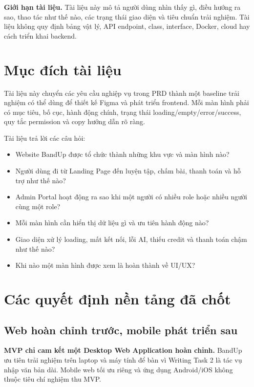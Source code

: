 \documentclass[11pt,a4paper]{article}
\begin{document}
\begin{importantbox}
\textbf{Giới hạn tài liệu.} Tài liệu này mô tả người dùng nhìn thấy gì, điều hướng ra sao, thao tác như thế nào, các trạng thái giao diện và tiêu chuẩn trải nghiệm. Tài liệu không quy định bảng vật lý, API endpoint, class, interface, Docker, cloud hay cách triển khai backend.
\end{importantbox}

\tableofcontents
\clearpage

\section*{Mục đích tài liệu}
Tài liệu này chuyển các yêu cầu nghiệp vụ trong PRD thành một baseline trải nghiệm có thể dùng để thiết kế Figma và phát triển frontend. Mỗi màn hình phải có mục tiêu, bố cục, hành động chính, trạng thái loading/empty/error/success, quy tắc permission và copy hướng dẫn rõ ràng.

Tài liệu trả lời các câu hỏi:
\begin{itemize}
  \item Website BandUp được tổ chức thành những khu vực và màn hình nào?
  \item Người dùng đi từ Landing Page đến luyện tập, chấm bài, thanh toán và hỗ trợ như thế nào?
  \item Admin Portal hoạt động ra sao khi một người có nhiều role hoặc nhiều người cùng một role?
  \item Mỗi màn hình cần hiển thị dữ liệu gì và ưu tiên hành động nào?
  \item Giao diện xử lý loading, mất kết nối, lỗi AI, thiếu credit và thanh toán chậm như thế nào?
  \item Khi nào một màn hình được xem là hoàn thành về UI/UX?
\end{itemize}

\section{Các quyết định nền tảng đã chốt}

\subsection{Web hoàn chỉnh trước, mobile phát triển sau}
\begin{decisionbox}
\textbf{MVP chỉ cam kết một Desktop Web Application hoàn chỉnh.} BandUp ưu tiên trải nghiệm trên laptop và máy tính để bàn vì Writing Task 2 là tác vụ nhập văn bản dài. Mobile web tối ưu riêng và ứng dụng Android/iOS không thuộc tiêu chí nghiệm thu MVP.
\end{decisionbox}
\end{document}
